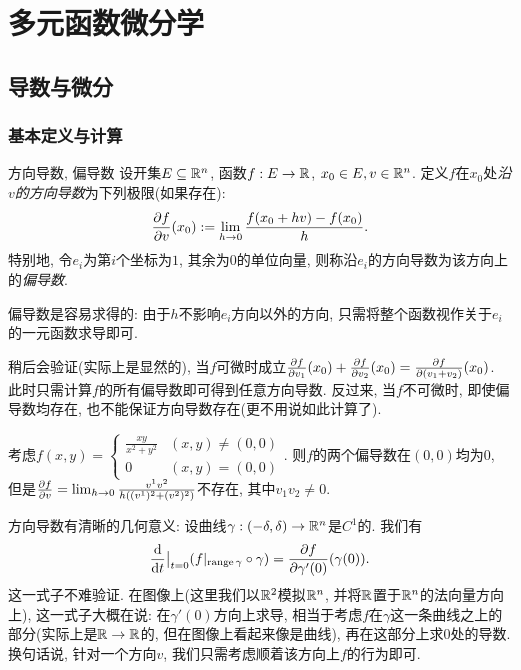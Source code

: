 \chapter{多元函数微分学}

\section{导数与微分}

\subsection{基本定义与计算}

\begin{definition}{方向导数, 偏导数}
    设开集$E \subseteq \mathbb{R} ^n$, 函数$f:E \to \mathbb{R}$, $x_0 \in E , v \in \mathbb{R} ^n$. 定义$f$在$x_0$处\textit{沿$v$的方向导数}为下列极限(如果存在): $$\frac{\partial f}{\partial v}(x_0) := \lim_{h \to 0} \frac{f(x_0+hv)-f(x_0)}{h}.$$
    特别地, 令$e_i$为第$i$个坐标为$1$, 其余为$0$的单位向量, 则称沿$e_i$的方向导数为该方向上的\textit{偏导数}. 
\end{definition}

偏导数是容易求得的: 由于$h$不影响$e_i$方向以外的方向, 只需将整个函数视作关于$e_i$的一元函数求导即可. 

稍后会验证(实际上是显然的), 当$f$可微时成立$\frac{\partial f}{\partial v_1}(x_0) + \frac{\partial f}{\partial v_2}(x_0) = \frac{\partial f}{\partial (v_1+v_2)}(x_0)$. 此时只需计算$f$的所有偏导数即可得到任意方向导数. 反过来, 当$f$不可微时, 即使偏导数均存在, 也不能保证方向导数存在(更不用说如此计算了). 

\begin{example}
	考虑$f(x,y)=\begin{cases}
		\frac{xy}{x^2+y^2} & (x,y) \neq (0,0) \\ 0 & (x,y)=(0,0)
	\end{cases}$. 则$f$的两个偏导数在$(0,0)$均为$0$, 但是$\frac{\partial f}{\partial v} = \lim_{h \to 0} \frac{v^1v^2}{h((v^1)^2+(v^2)^2)}$不存在, 其中$v_1v_2 \neq 0$. 
\end{example}

方向导数有清晰的几何意义: 设曲线$\gamma :(-\delta,\delta) \to \mathbb{R} ^n$是$C^1$的. 我们有$$\frac{\mathop{}\!\mathrm{d}}{\mathop{}\!\mathrm{d} t} \big|_{t=0} (f|_{\operatorname{range} \gamma} \circ \gamma) = \frac{\partial f}{\partial \gamma '(0)} (\gamma (0)). $$
这一式子不难验证. 在图像上(这里我们以$\mathbb{R} ^2$模拟$\mathbb{R} ^n$, 并将$\mathbb{R}$置于$\mathbb{R} ^n$的法向量方向上), 这一式子大概在说: 在$\gamma '(0)$方向上求导, 相当于考虑$f$在$\gamma$这一条曲线之上的部分(实际上是$\mathbb{R} \to \mathbb{R}$的, 但在图像上看起来像是曲线), 再在这部分上求$0$处的导数. 换句话说, 针对一个方向$v$, 我们只需考虑顺着该方向上$f$的行为即可. 

